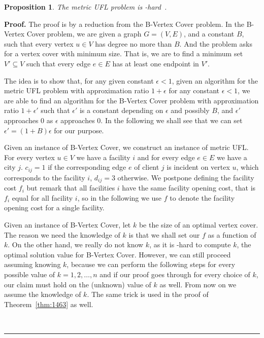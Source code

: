 \documentclass[oneside,final]{ucr}
\newtheorem{proposition}[theorem]{Proposition}
\newenvironment{proof}[1][Proof]{\textbf{#1.} }{\ \rule{0.5em}{0.5em}}
\begin{document}
\begin{proposition}\label{prop:maxsnp}
  The metric UFL problem is {\MaxSNP}-hard~\cite{GuhaK98}.
\end{proposition}
\begin{proof}
  The proof is by a reduction from the B-Vertex Cover problem. In the
  B-Vertex Cover problem, we are given a graph $G=(V,E)$, and a
  constant $B$, such that every vertex $u\in V$ has degree no more
  than $B$. And the problem asks for a vertex cover with minimum
  size. That is, we are to find a minimum set $V' \subseteq V$ such
  that every edge $e \in E$ has at least one endpoint in $V'$.

  The idea is to show that, for any given constant $\epsilon < 1$,
  given an algorithm for the metric UFL problem with approximation
  ratio $1+\epsilon$ for any constant $\epsilon < 1$, we are able to
  find an algorithm for the B-Vertex Cover problem with approximation
  ratio $1+\epsilon'$ such that $\epsilon'$ is a constant depending on
  $\epsilon$ and possibly $B$, and $\epsilon'$ approaches $0$ as
  $\epsilon$ approaches $0$. In the following we shall see that we can
  set $\epsilon' = (1+B)\epsilon$ for our purpose.

  Given an instance of B-Vertex Cover, we construct an instance of
  metric UFL. For every vertex $u \in V$ we have a facility $i$ and
  for every edge $e \in E$ we have a city $j$. $c_{ij} = 1$ if the
  corresponding edge $e$ of client $j$ is incident on vertex $u$,
  which corresponds to the facility $i$, $d_{ij} = 3$ otherwise. We
  postpone defining the facility cost $f_i$ but remark that all
  facilities $i$ have the same facility opening cost, that is $f_i$
  equal for all facility $i$, so in the following we use $f$ to denote
  the facility opening cost for a single facility.

  Given an instance of B-Vertex Cover, let $k$ be the size of an
  optimal vertex cover. The reason we need the knowledge of $k$ is
  that we shall set our $f$ as a function of $k$. On the other hand,
  we really do not know $k$, as it is \NP-hard to compute $k$, the
  optimal solution value for B-Vertex Cover. However, we can still
  proceed assuming knowing $k$, because we can perform the following
  steps for every possible value of $k=1,2,\ldots,n$ and if our proof
  goes through for every choice of $k$, our claim must hold on the
  (unknown) value of $k$ as well. From now on we assume the knowledge
  of $k$. The same trick is used in the proof of
  Theorem~\ref{thm:1463} as well.


\end{proof}
\end{document}
